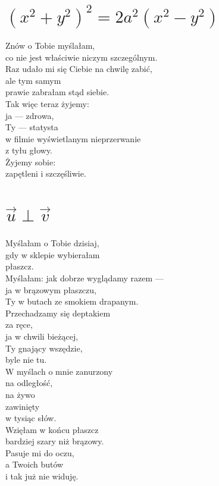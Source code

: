 \documentclass[12pt, a4paper]{memoir}
\renewenvironment{verse}{%
  \par\vspace{\baselineskip}\raggedright
}{
  \par\vspace{\baselineskip}
}
\begin{document}
\clearpage

\section[Lemniskata Bernoulliego]{$(x^2 + y^2)^2 = 2a^2(x^2 - y^2)$}
\begin{verse}
Znów o Tobie myślałam,\\
co nie jest właściwie niczym szczególnym.\\[\baselineskip]

Raz udało mi się Ciebie na chwilę zabić,\\
ale tym samym\\
prawie zabrałam stąd siebie.\\[\baselineskip]

Tak więc teraz żyjemy:\\
ja --- zdrowa,\\
Ty --- statysta\\
w filmie wyświetlanym nieprzerwanie\\
z tyłu głowy.\\[\baselineskip]

Żyjemy sobie:\\
zapętleni i szczęśliwie.
\end{verse}

\clearpage

\section[Wektory prostopadłe]{%
    $\vec{u} \perp \vec{v}$%
}
\begin{verse}
Myślałam o Tobie dzisiaj,\\
gdy w sklepie wybierałam\\
płaszcz.\\
Myślałam: jak dobrze wyglądamy razem ---\\
ja w brązowym płaszczu,\\
Ty w butach ze smokiem drapanym.\\
Przechadzamy się deptakiem\\
za ręce,\\
ja w chwili bieżącej,\\
Ty gnający wszędzie,\\
byle nie tu.\\
W myślach o mnie zanurzony\\
na odległość,\\
na żywo\\
zawinięty\\
w tysiąc słów.\\[\baselineskip]

Wzięłam w końcu płaszcz \\
bardziej szary niż brązowy.\\
Pasuje mi do oczu,\\
a Twoich butów\\
i tak już nie widuję.
\end{verse}
\end{document}
